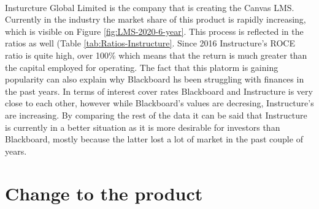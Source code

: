 \documentclass[]{article}
\begin{document}
\paragraph{}
Insturcture Global Limited is the company that is creating the Canvas LMS. Currently in the industry the market share of this product is rapidly increasing, which is visible on Figure \ref{fig:LMS-2020-6-year}. This process is reflected in the ratios as well (Table \ref{tab:Ratios-Instructure}. Since 2016 Instructure's ROCE ratio is quite high, over 100\% which means that the return is much greater than the capital employed for operating. The fact that this platorm is gaining popularity can also explain why Blackboard hs been struggling with finances in the past years. In terms of interest cover rates Blackboard and Instructure is very close to each other, however while Blackboard's values are decresing, Instructure's are increasing. By comparing the rest of the data it can be said that Instructure is currently in a better situation as it is more desirable for investors than Blackboard, mostly because the latter lost a lot of market in the past couple of years. 

\newpage

\section{Change to the product}

\paragraph{}
\newpage



\printbibliography{}
\end{document}
